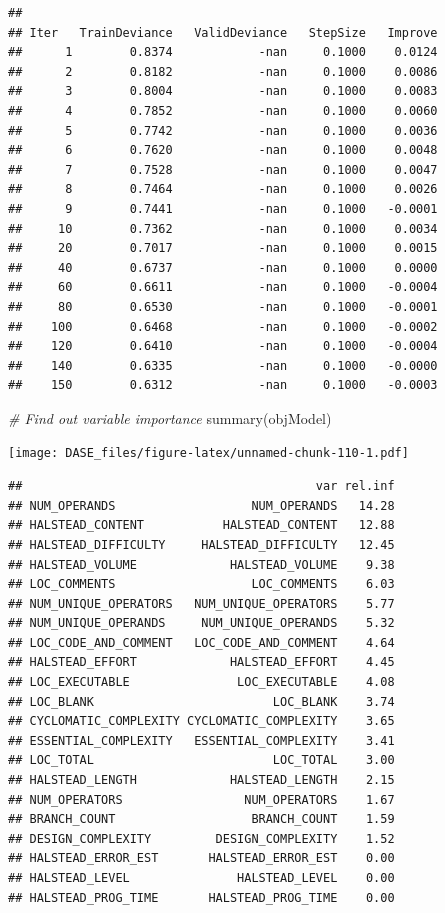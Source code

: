 \documentclass[
]{book}
\newenvironment{Shaded}{\begin{snugshade}}{\end{snugshade}}
\newcommand{\CommentTok}[1]{\textcolor[rgb]{0.56,0.35,0.01}{\textit{#1}}}
\newcommand{\FunctionTok}[1]{\textcolor[rgb]{0.00,0.00,0.00}{#1}}
\newcommand{\NormalTok}[1]{#1}
\begin{document}
\begin{verbatim}
## 
## Iter   TrainDeviance   ValidDeviance   StepSize   Improve
##      1        0.8374            -nan     0.1000    0.0124
##      2        0.8182            -nan     0.1000    0.0086
##      3        0.8004            -nan     0.1000    0.0083
##      4        0.7852            -nan     0.1000    0.0060
##      5        0.7742            -nan     0.1000    0.0036
##      6        0.7620            -nan     0.1000    0.0048
##      7        0.7528            -nan     0.1000    0.0047
##      8        0.7464            -nan     0.1000    0.0026
##      9        0.7441            -nan     0.1000   -0.0001
##     10        0.7362            -nan     0.1000    0.0034
##     20        0.7017            -nan     0.1000    0.0015
##     40        0.6737            -nan     0.1000    0.0000
##     60        0.6611            -nan     0.1000   -0.0004
##     80        0.6530            -nan     0.1000   -0.0001
##    100        0.6468            -nan     0.1000   -0.0002
##    120        0.6410            -nan     0.1000   -0.0004
##    140        0.6335            -nan     0.1000   -0.0000
##    150        0.6312            -nan     0.1000   -0.0003
\end{verbatim}

\begin{Shaded}
\begin{Highlighting}[]
\CommentTok{\# Find out variable importance}
\FunctionTok{summary}\NormalTok{(objModel)}
\end{Highlighting}
\end{Shaded}

\texttt{[image: DASE\_files/figure-latex/unnamed-chunk-110-1.pdf]}

\begin{verbatim}
##                                         var rel.inf
## NUM_OPERANDS                   NUM_OPERANDS   14.28
## HALSTEAD_CONTENT           HALSTEAD_CONTENT   12.88
## HALSTEAD_DIFFICULTY     HALSTEAD_DIFFICULTY   12.45
## HALSTEAD_VOLUME             HALSTEAD_VOLUME    9.38
## LOC_COMMENTS                   LOC_COMMENTS    6.03
## NUM_UNIQUE_OPERATORS   NUM_UNIQUE_OPERATORS    5.77
## NUM_UNIQUE_OPERANDS     NUM_UNIQUE_OPERANDS    5.32
## LOC_CODE_AND_COMMENT   LOC_CODE_AND_COMMENT    4.64
## HALSTEAD_EFFORT             HALSTEAD_EFFORT    4.45
## LOC_EXECUTABLE               LOC_EXECUTABLE    4.08
## LOC_BLANK                         LOC_BLANK    3.74
## CYCLOMATIC_COMPLEXITY CYCLOMATIC_COMPLEXITY    3.65
## ESSENTIAL_COMPLEXITY   ESSENTIAL_COMPLEXITY    3.41
## LOC_TOTAL                         LOC_TOTAL    3.00
## HALSTEAD_LENGTH             HALSTEAD_LENGTH    2.15
## NUM_OPERATORS                 NUM_OPERATORS    1.67
## BRANCH_COUNT                   BRANCH_COUNT    1.59
## DESIGN_COMPLEXITY         DESIGN_COMPLEXITY    1.52
## HALSTEAD_ERROR_EST       HALSTEAD_ERROR_EST    0.00
## HALSTEAD_LEVEL               HALSTEAD_LEVEL    0.00
## HALSTEAD_PROG_TIME       HALSTEAD_PROG_TIME    0.00
\end{verbatim}
\end{document}

